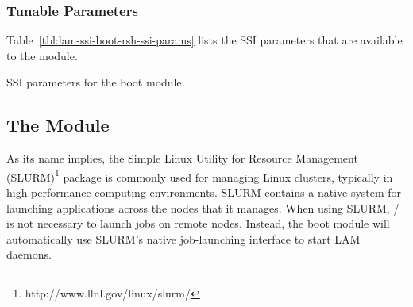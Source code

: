 
\subsubsection{Tunable Parameters}


Table~\ref{tbl:lam-ssi-boot-rsh-ssi-params} lists the SSI parameters that
are available to the  module.


\begin{table}[htbp]
  \begin{ssiparamtb}
%
%
% 
     
%
%
%
  \end{ssiparamtb}
  \caption{SSI parameters for the  boot module.}
  \label{tbl:lam-ssi-boot-rsh-ssi-params}
\end{table}


\subsection{The  Module}


As its name implies, the Simple Linux Utility for Resource Management
(SLURM)\footnote{http://www.llnl.gov/linux/slurm/} package is commonly
used for managing Linux clusters, typically in high-performance
computing environments.  SLURM contains a native system for launching
applications across the nodes that it manages.  When using SLURM,
/ is not necessary to launch jobs on remote nodes.
Instead, the  boot module will automatically use SLURM's
native job-launching interface to start LAM daemons.

